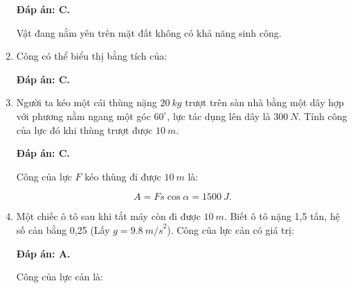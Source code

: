 \begin{enumerate}[label=\bfseries Câu \arabic*:]
	\hideall
	{	
			\textbf{Đáp án: C.}
		
		Vật đang nằm yên trên mặt đất không có khả năng sinh công.
	}
		\item {}
	
	
	{Công có thể biểu thị bằng tích của:
	}
	
	\hideall
	{	
		\textbf{Đáp án: C.}
	}
		\item {}
	
	
	{
		Người ta kéo một cái thùng nặng $\SI{20}{kg}$ trượt trên sàn nhà bằng một dây hợp với phương nằm ngang một góc $60^\circ$, lực tác dụng lên dây là $\SI{300}{N}$. Tính công của lực đó khi thùng trượt được $\SI{10}{m}$. 
	}
	
	\hideall
	{	
		\textbf{Đáp án: C.}
		
		Công của lực $F$ kéo thùng đi được $\SI{10}{m}$ là:
		
		$$A = Fs\cos \alpha = \SI{1500}{J}.$$
	}

		\item {}
	
	
	{Một chiếc ô tô sau khi tắt máy còn đi được $\SI{10}{m}$. Biết ô tô nặng 1,5 tấn, hệ số cản bằng 0,25 (Lấy $g = \SI{9,8}{m/s}^2$). Công của lực cản có giá trị:
	}
	
	\hideall
	{	
		\textbf{Đáp án: A.}
		
		Công của lực cản là: 
		
}
\end{enumerate}
